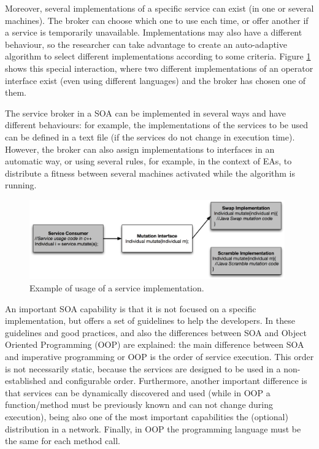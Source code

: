 Moreover, several implementations of a specific service  can exist (in
one or several machines). The broker can choose which one to use  each
time, or offer another if a service is temporarily
unavailable. Implementations  may also have a different behaviour, so
the researcher can take advantage to create an auto-adaptive algorithm
to select different implementations according to some criteria. %
Figure \ref{fig:servicebasic} shows this special interaction, where two different implementations of an operator interface exist (even using different languages) and the broker has chosen one of them.


The service broker in a SOA can be implemented in several ways and have
different behaviours: for example, the implementations of the services to be used can be
defined in a text file (if the services do not change in execution
time). However, the broker can also assign implementations to
interfaces in an automatic way, or using several rules, for example, in the context of EAs,
to distribute a fitness between several machines activated while the
algorithm is running. %


\begin{figure}
\centering
\includegraphics[width=26pc]{gfx/soa/exampleSOA.jpg}
\caption{Example of usage of a service implementation.}
\label{fig:servicebasic}
\end{figure}




An important SOA capability is that it is not focused on a specific
implementation, but offers a set of guidelines to help the
developers. In \cite{Arsanjani2008SOMA} these guidelines and good practices, and also the differences between SOA and Object Oriented
Programming (OOP) are
explained: the main difference between SOA and imperative programming or OOP is the order of service execution. This order is not necessarily static, because the services are designed to be used in a non-established and configurable order. Furthermore, another important difference is that services can be dynamically discovered and used (while in OOP a function/method must be previously known and can not change during execution), being also one of the most important capabilities the (optional) distribution in a network. Finally, in OOP the programming language must be the same for each method call.

